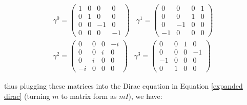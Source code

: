 \documentclass[11pt]{article}
\theoremstyle{definition}
\begin{document}
\begin{align*}
    \gamma^{0} = 
    \begin{pmatrix}
        1&0&0&0\\ 
        0&1&0&0\\ 
        0&0&-1&0\\ 
        0&0&0&-1
    \end{pmatrix}
    \;\;\;
    \gamma^{1} = 
    \begin{pmatrix}
        0&0&0&1\\ 
        0&0&1&0\\ 
        0&-1&0&0\\ 
        -1&0&0&0
    \end{pmatrix}\\
    \gamma^{2} = 
    \begin{pmatrix}
        0&0&0&-i\\ 
        0&0&i&0\\ 
        0&i&0&0\\ 
        -i&0&0&0
    \end{pmatrix}
    \;\;\;
    \gamma^{3} = 
    \begin{pmatrix}
        0&0&1&0\\ 
        0&0&0&-1\\ 
        -1&0&0&0\\ 
        0&1&0&0
    \end{pmatrix}
\end{align*}

thus plugging these matrices into the Dirac equation in Equation \ref{expanded dirac} (turning $m$ to matrix form as $mI$), we have:
\end{document}
